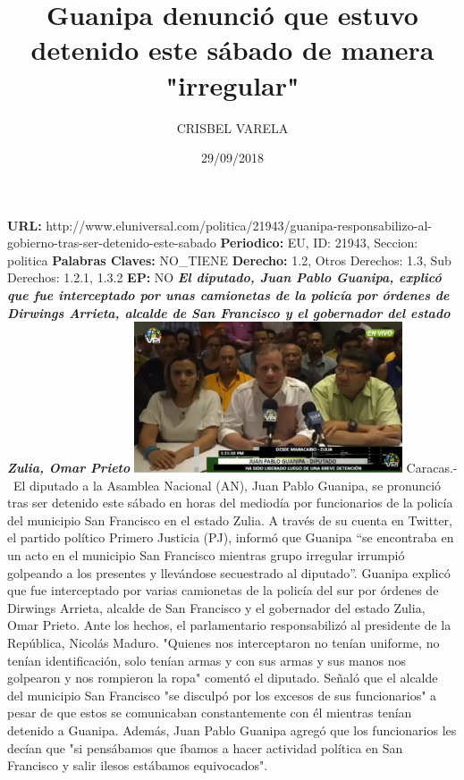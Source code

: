 \documentclass{article}%
\title{\textbf{Guanipa denunció que estuvo detenido este sábado de manera "irregular"}}%
\author{CRISBEL VARELA}%
\date{29/09/2018}%
\begin{document}
%
\normalsize%
\maketitle%
\textbf{URL: }%
http://www.eluniversal.com/politica/21943/guanipa{-}responsabilizo{-}al{-}gobierno{-}tras{-}ser{-}detenido{-}este{-}sabado\newline%
%
\textbf{Periodico: }%
EU, %
ID: %
21943, %
Seccion: %
politica\newline%
%
\textbf{Palabras Claves: }%
NO\_TIENE\newline%
%
\textbf{Derecho: }%
1.2, %
Otros Derechos: %
1.3, %
Sub Derechos: %
1.2.1, 1.3.2\newline%
%
\textbf{EP: }%
NO\newline%
\newline%
%
\textbf{\textit{El diputado, Juan Pablo Guanipa, explicó que fue interceptado por unas camionetas de la policía por órdenes de Dirwings Arrieta, alcalde de San Francisco y el gobernador del estado Zulia, Omar Prieto}}%
\newline%
\newline%
%
\includegraphics[width=300px]{28.jpg}%
\newline%
%
Caracas.{-}~El diputado a la Asamblea Nacional (AN), Juan Pablo Guanipa, se pronunció tras ser detenido este sábado en horas del mediodía por funcionarios de la policía del municipio San Francisco en el estado Zulia.%
\newline%
%
A través de su cuenta en Twitter, el partido político Primero Justicia (PJ), informó que Guanipa “se encontraba en un acto en el municipio San Francisco mientras grupo irregular irrumpió golpeando a los presentes y llevándose secuestrado al diputado”.%
\newline%
%
Guanipa explicó que fue interceptado por varias camionetas de la policía del sur por órdenes de Dirwings Arrieta, alcalde de San Francisco y el gobernador del estado Zulia, Omar Prieto.%
\newline%
%
Ante los hechos, el parlamentario responsabilizó al presidente de la República, Nicolás Maduro.%
\newline%
%
"Quienes nos interceptaron no tenían uniforme, no tenían identificación, solo tenían armas y con sus armas y sus manos nos golpearon y nos rompieron la ropa" comentó el diputado.%
\newline%
%
Señaló que el alcalde del municipio San Francisco "se disculpó por los excesos de sus funcionarios" a pesar de que estos se comunicaban constantemente con él mientras tenían detenido a Guanipa.%
\newline%
%
Además, Juan Pablo Guanipa agregó que los funcionarios les decían que "si pensábamos que íbamos a hacer actividad política en San Francisco y salir ilesos estábamos equivocados".%
\newline%
%
\end{document}
